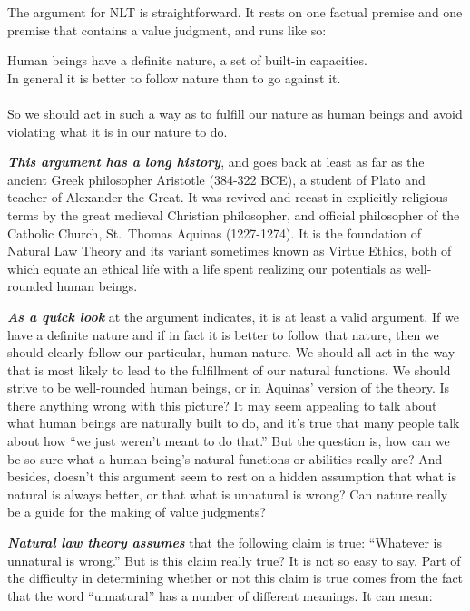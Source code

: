 \documentclass[12pt, openany]{book}
\begin{document}
The argument for NLT is straightforward. It rests on one factual premise and one premise that contains a value judgment, and runs like so:

\begin{center}

\begin{argument}

Human beings have a definite nature, a set of built-in capacities.\\
In general it is better to follow nature than to go against it.\\
~\\
So we should act in such a way as to fulfill our nature as human beings and avoid violating what it is in our nature to do.

\end{argument}

\end{center}

\textbf{\emph{This argument has a long history}}, and goes back at least as far as the ancient Greek philosopher Aristotle (384-322 BCE), a student of Plato and teacher of Alexander the Great. It was revived and recast in explicitly religious terms by the great medieval Christian philosopher, and official philosopher of the Catholic Church, St.~Thomas Aquinas (1227-1274). It is the foundation of Natural Law Theory and its variant sometimes known as Virtue Ethics, both of which equate an ethical life with a life spent realizing our potentials as well-rounded human beings.

\textbf{\emph{As a quick look}} at the argument indicates, it is at least a valid argument. If we have a definite nature and if in fact it is better to follow that nature, then we should clearly follow our particular, human nature. We should all act in the way that is most likely to lead to the fulfillment of our natural functions. We should strive to be well-rounded human beings, or in Aquinas' version of the theory. Is there anything wrong with this picture? It may seem appealing to talk about what human beings are naturally built to do, and it's true that many people talk about how ``we just weren't meant to do that.'' But the question is, how can we be so sure what a human being's natural functions or abilities really are? And besides, doesn't this argument seem to rest on a hidden assumption that what is natural is always better, or that what is unnatural is wrong? Can nature really be a guide for the making of value judgments?

\textbf{\emph{Natural law theory assumes}} that the following claim is true: ``Whatever is unnatural is wrong.'' But is this claim really true? It is not so easy to say. Part of the difficulty in determining whether or not this claim is true comes from the fact that the word ``unnatural'' has a number of different meanings. It can mean:
\end{document}
